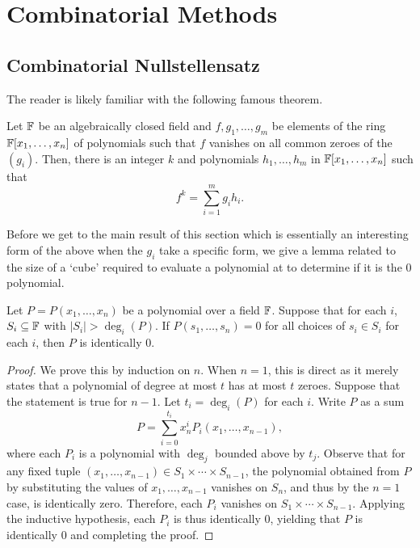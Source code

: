 \section{Combinatorial Methods}

\subsection{Combinatorial Nullstellensatz}

	The reader is likely familiar with the following famous theorem.

	\begin{ftheo}
		Let $\mathbb{F}$ be an algebraically closed field and $f,g_1,\ldots,g_m$ be elements of the ring $\mathbb{F}[x_1,\ldots,x_n]$ of polynomials such that $f$ vanishes on all common zeroes of the $(g_i)$. Then, there is an integer $k$ and polynomials $h_1,\ldots,h_m$ in $\mathbb{F}[x_1,\ldots,x_n]$ such that
		\[ f^k = \sum_{i=1}^{m} g_i h_i. \]
	\end{ftheo}

	Before we get to the main result of this section which is essentially an interesting form of the above when the $g_i$ take a specific form, we give a lemma related to the size of a `cube' required to evaluate a polynomial at to determine if it is the $0$ polynomial.

	\begin{lemma}
		\label{lem: comb null lem}
		Let $P = P(x_1,\ldots,x_n)$ be a polynomial over a field $\mathbb{F}$. Suppose that for each $i$, $S_i \subseteq \mathbb{F}$ with $|S_i| > \deg_i(P)$. If $P(s_1,\ldots,s_n) = 0$ for all choices of $s_i \in S_i$ for each $i$, then $P$ is identically $0$. 
	\end{lemma}
	\begin{proof}
		We prove this by induction on $n$. When $n=1$, this is direct as it merely states that a polynomial of degree at most $t$ has at most $t$ zeroes. Suppose that the statement is true for $n-1$. Let $t_i = \deg_i(P)$ for each $i$. Write $P$ as a sum
		\[ P = \sum_{i=0}^{t_i} x_n^i P_i(x_1,\ldots,x_{n-1}), \]
		where each $P_i$ is a polynomial with $\deg_j$ bounded above by $t_j$. Observe that for any fixed tuple $(x_1,\ldots,x_{n-1}) \in S_1 \times \cdots \times S_{n-1}$, the polynomial obtained from $P$ by substituting the values of $x_1,\ldots,x_{n-1}$ vanishes on $S_n$, and thus by the $n=1$ case, is identically zero. Therefore, each $P_i$ vanishes on $S_1 \times \cdots \times S_{n-1}$. Applying the inductive hypothesis, each $P_i$ is thus identically $0$, yielding that $P$ is identically $0$ and completing the proof.
	\end{proof}

